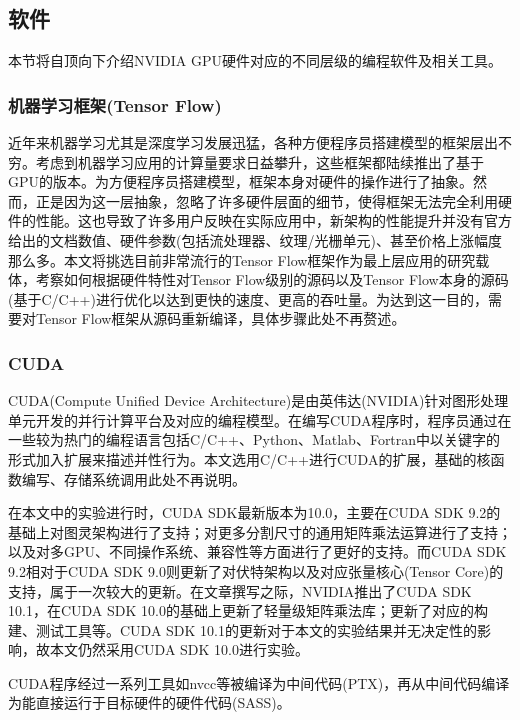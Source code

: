 \subsection{软件}
\par 本节将自顶向下介绍NVIDIA GPU硬件对应的不同层级的编程软件及相关工具。
\subsubsection{机器学习框架(Tensor Flow)}
\par 近年来机器学习尤其是深度学习发展迅猛，各种方便程序员搭建模型的框架层出不穷。考虑到机器学习应用的计算量要求日益攀升，这些框架都陆续推出了基于GPU的版本。为方便程序员搭建模型，框架本身对硬件的操作进行了抽象。然而，正是因为这一层抽象，忽略了许多硬件层面的细节，使得框架无法完全利用硬件的性能。这也导致了许多用户反映在实际应用中，新架构的性能提升并没有官方给出的文档数值、硬件参数(包括流处理器、纹理/光栅单元)、甚至价格上涨幅度那么多。本文将挑选目前非常流行的Tensor Flow框架作为最上层应用的研究载体，考察如何根据硬件特性对Tensor Flow级别的源码以及Tensor Flow本身的源码(基于C/C++)进行优化以达到更快的速度、更高的吞吐量。为达到这一目的，需要对Tensor Flow框架从源码重新编译，具体步骤此处不再赘述\parencite{TFBUILD}。
\subsubsection{CUDA}
\par CUDA(Compute Unified Device Architecture)是由英伟达(NVIDIA)针对图形处理单元开发的并行计算平台及对应的编程模型。在编写CUDA程序时，程序员通过在一些较为热门的编程语言包括C/C++、Python、Matlab、Fortran中以关键字的形式加入扩展来描述并性行为\parencite{CUDAZONE}。本文选用C/C++进行CUDA的扩展，基础的核函数编写、存储系统调用\parencite{EVENEASIER}此处不再说明。
\par 在本文中的实验进行时，CUDA SDK最新版本为10.0，主要在CUDA SDK 9.2的基础上对图灵架构进行了支持；对更多分割尺寸的通用矩阵乘法运算进行了支持\parencite{10.0PATCH}；以及对多GPU、不同操作系统、兼容性等方面进行了更好的支持。而CUDA SDK 9.2相对于CUDA SDK 9.0则更新了对伏特架构以及对应张量核心(Tensor Core)的支持，属于一次较大的更新\parencite{9.2PATCH}。在文章撰写之际，NVIDIA推出了CUDA SDK 10.1，在CUDA SDK 10.0的基础上更新了轻量级矩阵乘法库；更新了对应的构建、测试工具等\parencite{10.1PATCH}。CUDA SDK 10.1的更新对于本文的实验结果并无决定性的影响，故本文仍然采用CUDA SDK 10.0进行实验。
\par CUDA程序经过一系列工具如nvcc等被编译为中间代码(PTX)，再从中间代码编译为能直接运行于目标硬件的硬件代码(SASS)。
